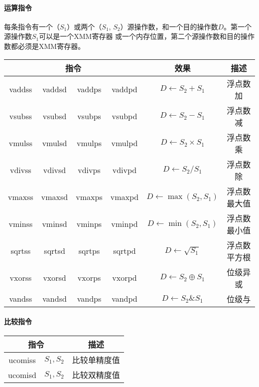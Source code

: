\paragraph{运算指令}
每条指令有一个（$S_1$）或两个（$S_1$, $S_2$）源操作数，和一个目的操作数$D$。第一个源操作数$S_1$可以是一个XMM寄存器
或一个内存位置，第二个源操作数和目的操作数都必须是XMM寄存器。
\begin{table}[H]
    \centering
    \begin{tabular}{|c|c|c|c|c|c|}
        \hline
        \multicolumn{4}{|c|}{\textbf{指令}} & \textbf{效果} & \textbf{描述}                                                   \\
        \hline
        vaddss                            & vaddsd      & vaddps      & vaddpd & $D \leftarrow S_2 + S_1$      & 浮点数加   \\
        \hline
        vsubss                            & vsubsd      & vsubps      & vsubpd & $D \leftarrow S_2 - S_1$      & 浮点数减   \\
        \hline
        vmulss                            & vmulsd      & vmulps      & vmulpd & $D \leftarrow S_2 \times S_1$ & 浮点数乘   \\
        \hline
        vdivss                            & vdivsd      & vdivps      & vdivpd & $D \leftarrow S_2 / S_1$      & 浮点数除   \\
        \hline
        vmaxss                            & vmaxsd      & vmaxps      & vmaxpd & $D \leftarrow \max(S_2, S_1)$ & 浮点数最大值 \\
        \hline
        vminss                            & vminsd      & vminps      & vminpd & $D \leftarrow \min(S_2, S_1)$ & 浮点数最小值 \\
        \hline
        sqrtss                            & sqrtsd      & sqrtps      & sqrtpd & $D \leftarrow \sqrt{S_1}$     & 浮点数平方根 \\
        \hline
        vxorss                            & vxorsd      & vxorps      & vxorpd & $D \leftarrow S_2 \oplus S_1$ & 位级异或   \\
        \hline
        vandss                            & vandsd      & vandps      & vandpd & $D \leftarrow S_2 \& S_1$     & 位级与    \\
        \hline
    \end{tabular}
\end{table}

\paragraph{比较指令}
\begin{table}[H]
    \centering
    \begin{tabular}{|c c|c|}
        \hline
        \multicolumn{2}{|c|}{\textbf{指令}} & \textbf{描述}          \\
        \hline
        ucomiss                           & $S_1, S_2$  & 比较单精度值 \\
        \hline
        ucomisd                           & $S_1, S_2$  & 比较双精度值 \\
        \hline
    \end{tabular}
\end{table}

